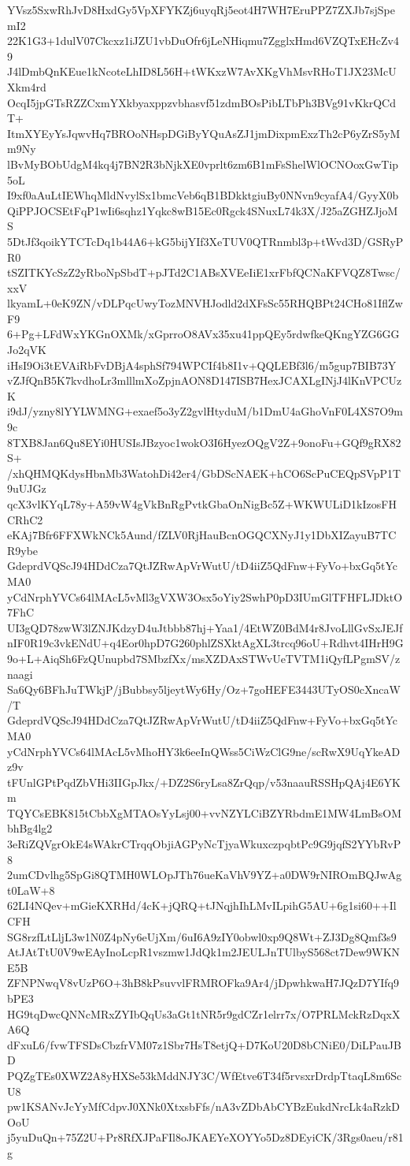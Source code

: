 YVsz5SxwRhJvD8HxdGy5VpXFYKZj6uyqRj5eot4H7WH7EruPPZ7ZXJb7sjSpemI2
22K1G3+1dulV07Ckcxz1iJZU1vbDuOfr6jLeNHiqmu7ZgglxHmd6VZQTxEHcZv49
J4lDmbQnKEue1kNcoteLhID8L56H+tWKxzW7AvXKgVhMsvRHoT1JX23McUXkm4rd
OcqI5jpGTsRZZCxmYXkbyaxppzvbhasvf51zdmBOsPibLTbPh3BVg91vKkrQCdT+
ItmXYEyYsJqwvHq7BROoNHspDGiByYQuAsZJ1jmDixpmExzTh2cP6yZrS5yMm9Ny
lBvMyBObUdgM4kq4j7BN2R3bNjkXE0vprlt6zm6B1mFsShelWlOCNOoxGwTip5oL
I9xf0aAuLtIEWhqMldNvylSx1bmcVeb6qB1BDkktgiuBy0NNvn9cyafA4/GyyX0b
QiPPJOCSEtFqP1wIi6sqhz1Yqkc8wB15Ec0Rgck4SNuxL74k3X/J25aZGHZJjoMS
5DtJf3qoikYTCTcDq1b44A6+kG5bijYIf3XeTUV0QTRnmbl3p+tWvd3D/GSRyPR0
tSZITKYcSzZ2yRboNpSbdT+pJTd2C1ABsXVEeIiE1xrFbfQCNaKFVQZ8Twsc/xxV
lkyamL+0eK9ZN/vDLPqcUwyTozMNVHJodld2dXFsSc55RHQBPt24CHo81IflZwF9
6+Pg+LFdWxYKGnOXMk/xGprroO8AVx35xu41ppQEy5rdwfkeQKngYZG6GGJo2qVK
iHsI9Oi3tEVAiRbFvDBjA4sphSf794WPCIf4b8I1v+QQLEBf3l6/m5gup7BIB73Y
vZJfQnB5K7kvdhoLr3mlllmXoZpjnAON8D147ISB7HexJCAXLgINjJ4lKnVPCUzK
i9dJ/yzny8lYYLWMNG+exaef5o3yZ2gvlHtyduM/b1DmU4aGhoVnF0L4XS7O9m9c
8TXB8Jan6Qu8EYi0HUSIsJBzyoc1wokO3I6HyezOQgV2Z+9onoFu+GQf9gRX82S+
/xhQHMQKdysHbnMb3WatohDi42er4/GbDScNAEK+hCO6ScPuCEQpSVpP1T9uUJGz
qcX3vlKYqL78y+A59vW4gVkBnRgPvtkGbaOnNigBc5Z+WKWULiD1kIzosFHCRhC2
eKAj7Bfr6FFXWkNCk5Aund/fZLV0RjHauBcnOGQCXNyJ1y1DbXIZayuB7TCR9ybe
GdeprdVQScJ94HDdCza7QtJZRwApVrWutU/tD4iiZ5QdFnw+FyVo+bxGq5tYcMA0
yCdNrphYVCs64lMAcL5vMl3gVXW3Osx5oYiy2SwhP0pD3IUmGlTFHFLJDktO7FhC
UI3gQD78zwW3lZNJKdzyD4uJtbbb87hj+Yaa1/4EtWZ0BdM4r8JvoLllGvSxJEJf
nIF0R19c3vkENdU+q4Eor0hpD7G260phlZSXktAgXL3trcq96oU+Rdhvt4IHrH9G
9o+L+AiqSh6FzQUnupbd7SMbzfXx/msXZDAxSTWvUeTVTM1iQyfLPgmSV/znaagi
Sa6Qy6BFhJuTWkjP/jBubbsy5ljeytWy6Hy/Oz+7goHEFE3443UTyOS0cXncaW/T
GdeprdVQScJ94HDdCza7QtJZRwApVrWutU/tD4iiZ5QdFnw+FyVo+bxGq5tYcMA0
yCdNrphYVCs64lMAcL5vMhoHY3k6eeInQWss5CiWzClG9ne/scRwX9UqYkeADz9v
tFUnlGPtPqdZbVHi3IIGpJkx/+DZ2S6ryLsa8ZrQqp/v53naauRSSHpQAj4E6YKm
TQYCsEBK815tCbbXgMTAOsYyLsj00+vvNZYLCiBZYRbdmE1MW4LmBsOMbhBg4lg2
3eRiZQVgrOkE4sWAkrCTrqqObjiAGPyNcTjyaWkuxczpqbtPc9G9jqfS2YYbRvP8
2umCDvlhg5SpGi8QTMH0WLOpJTh76ueKaVhV9YZ+a0DW9rNIROmBQJwAgt0LaW+8
62LI4NQev+mGieKXRHd/4cK+jQRQ+tJNqjhIhLMvILpihG5AU+6g1si60++IlCFH
SG8rzfLtLljL3w1N0Z4pNy6eUjXm/6uI6A9zIY0obwl0xp9Q8Wt+ZJ3Dg8Qmf3s9
AtJAtTtU0V9wEAyInoLcpR1vszmw1JdQk1m2JEULJnTUlbyS568ct7Dew9WKNE5B
ZFNPNwqV8vUzP6O+3hB8kPsuvvlFRMROFka9Ar4/jDpwhkwaH7JQzD7YIfq9bPE3
HG9tqDwcQNNcMRxZYIbQqUs3aGt1tNR5r9gdCZr1elrr7x/O7PRLMckRzDqxXA6Q
dFxuL6/fvwTFSDsCbzfrVM07z1Sbr7HsT8etjQ+D7KoU20D8bCNiE0/DiLPauJBD
PQZgTEs0XWZ2A8yHXSe53kMddNJY3C/WfEtve6T34f5rvsxrDrdpTtaqL8m6ScU8
pw1KSANvJcYyMfCdpvJ0XNk0XtxsbFfs/nA3vZDbAbCYBzEukdNrcLk4aRzkDOoU
j5yuDuQn+75Z2U+Pr8RfXJPaFIl8oJKAEYeXOYYo5Dz8DEyiCK/3Rgs0aeu/r81g
